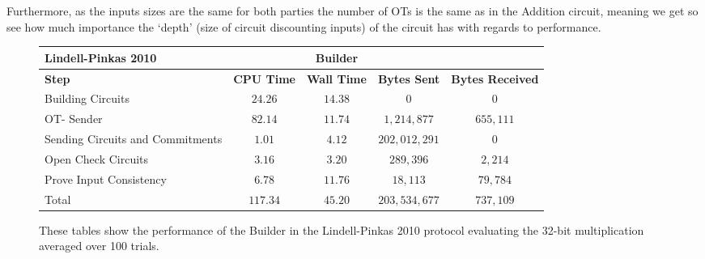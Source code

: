 \documentclass[ %
                    author={Nicholas Tutte},
                supervisor={Prof. Nigel Smart},
                    degree={MEng},
                     title={Secure Two Party Computation},
                  subtitle={A practical comparison of recent protocols},
                      type={Research - GG1K},
                      year={2015} ]{dissertation}
\begin{document}
				Furthermore, as the inputs sizes are the same for both parties the number of OTs is the same as in the Addition circuit, meaning we get so see how much importance the `depth' (size of circuit discounting inputs) of the circuit has with regards to performance.\\

				\begin{figure}[!ht]
					\begin{tabular}{| p{3.5cm} | c c c c |}
						\hline
						\textbf{Lindell-Pinkas 2010} & & \textbf{Builder} & & \\
						\hline
						\textbf{Step} & \textbf{CPU Time} & \textbf{Wall Time} & \textbf{Bytes Sent} & \textbf{Bytes Received} \\
						\thickhline
						Building Circuits & $24.26$ & $14.38$ & $0$ & $0$ \\
						\hline
						OT- Sender & $82.14$ & $11.74$ & $1,214,877$ & $655,111$ \\
						\hline
						Sending Circuits and Commitments & $1.01$ & $4.12$ & $202,012,291$ & $0$ \\
						\hline
						Open Check Circuits & $3.16$ & $3.20$ & $289,396$ & $2,214$ \\
						\hline
						Prove Input Consistency & $6.78$ & $11.76$ & $18,113$ & $79,784$ \\
						\thickhline
						Total & $117.34$ & $45.20$ & $203,534,677$ & $737,109$ \\
						\hline
					\end{tabular}

					\caption{These tables show the performance of the Builder in the Lindell-Pinkas 2010 protocol evaluating the 32-bit multiplication averaged over 100 trials. \label{table:LP_2010_Mul_Builder}}
				\end{figure}
				
\end{document}
